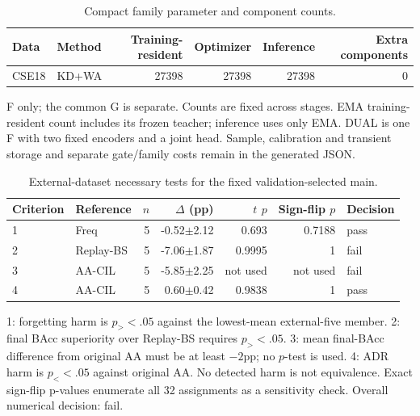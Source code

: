 \begin{table}[t]
\centering\scriptsize
\setlength{\tabcolsep}{3.3pt}
\caption{Compact family parameter and component counts.}\label{tab:compact-capacity}
\begin{tabular}{llrrrr}
\toprule
Data & Method & Training-resident & Optimizer & Inference & Extra components \\
\midrule
CSE18 & KD+WA & 27398 & 27398 & 27398 & 0 \\
\bottomrule
\end{tabular}
\par\smallskip\begin{minipage}{0.98\textwidth}\scriptsize F only; the common G is separate. Counts are fixed across stages. EMA training-resident count includes its frozen teacher; inference uses only EMA. DUAL is one F with two fixed encoders and a joint head. Sample, calibration and transient storage and separate gate/family costs remain in the generated JSON.\end{minipage}
\end{table}

\begin{table}[t]
\centering\scriptsize
\setlength{\tabcolsep}{3.3pt}
\caption{External-dataset necessary tests for the fixed validation-selected main.}\label{tab:compact-cse-tests}
\begin{tabular}{llrrrrl}
\toprule
Criterion & Reference & $n$ & $\Delta$ (pp) & $t$ $p$ & Sign-flip $p$ & Decision \\
\midrule
1 & Freq & 5 & -0.52$\pm$2.12 & 0.693 & 0.7188 & pass \\
2 & Replay-BS & 5 & -7.06$\pm$1.87 & 0.9995 & 1 & fail \\
3 & AA-CIL & 5 & -5.85$\pm$2.25 & not used & not used & fail \\
4 & AA-CIL & 5 & 0.60$\pm$0.42 & 0.9838 & 1 & pass \\
\bottomrule
\end{tabular}
\par\smallskip\begin{minipage}{0.98\textwidth}\scriptsize 1: forgetting harm is $p_{>}<.05$ against the lowest-mean external-five member. 2: final BAcc superiority over Replay-BS requires $p_{>}<.05$. 3: mean final-BAcc difference from original AA must be at least $-2$pp; no $p$-test is used. 4: ADR harm is $p_{<}<.05$ against original AA. No detected harm is not equivalence. Exact sign-flip p-values enumerate all 32 assignments as a sensitivity check. Overall numerical decision: fail.\end{minipage}
\end{table}
